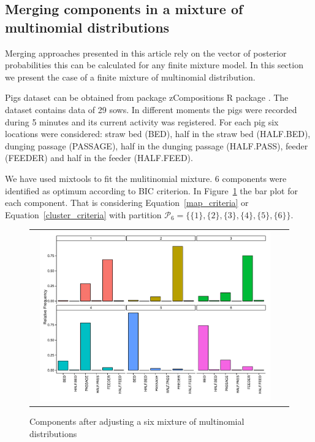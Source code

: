 \documentclass[submit]{smj}
\theoremstyle{definition}
\newcommand{\pkg}[1]{{\fontseries{b}\selectfont #1}}
\begin{document}
\subsection{Merging components in a mixture of multinomial distributions}

Merging approaches presented in this article rely on the vector of posterior probabilities this can be calculated for any finite mixture model. In this section we present the case of a finite mixture of multinomial distribution.

Pigs dataset can be obtained from package \pkg{zCompositions} R package \citep{palarea2012zcompositions}. The dataset contains data of 29 sows. In different moments the pigs were recorded during 5 minutes and its current activity was registered. For each pig six locations were considered: straw bed (BED), half in the straw bed (HALF.BED), dunging passage (PASSAGE), half in the dunging passage (HALF.PASS), feeder (FEEDER) and half in the feeder (HALF.FEED).

We have used \pkg{mixtools} \citep{benaglia2009mixtools} to fit the mulitinomial mixture. 6 components were identified as optimum according to BIC criterion. In Figure~\ref{multinomial_mixture} the bar plot for each component. That is considering Equation~\ref{map_criteria} or Equation~\ref{cluster_criteria} with partition $\mathcal{P}_6 = \{\{1\}, \{2\}, \{3\}, \{4\}, \{5\}, \{6\}\}$.

\begin{figure}[t]
\begin{center}
\begin{tabular}{cc}
  \includegraphics[width=0.95\textwidth]{figures/multinomial_mixt_all.pdf} \\
 \end{tabular}
 \caption{Components after adjusting a six mixture of multinomial distributions}\label{multinomial_mixture}
\end{center}
\end{figure}
\end{document}
